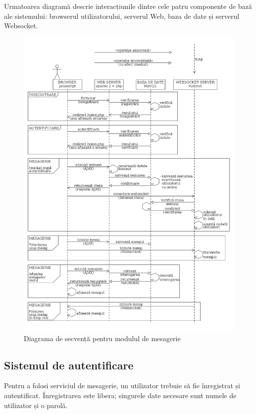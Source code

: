 \documentclass[12pt,a4paper]{article}
\begin{document}
Urmatoarea diagramă descrie interacțiunile dintre cele patru componente 
de bază ale sistemului: browserul utilizatorului, serverul Web, baza de date și 
serverul Websocket.

%
\newpage
	\begin{figure}[!ht]
	\centering
	\includegraphics[height=0.97\textheight]{diagrame/chat_sequence.png}
	\vspace{-20pt} 
	\caption{Diagrama de secvență pentru modulul de mesagerie \label{overflow}}
	\vspace{-20pt} 
\end{figure}

\subsection{Sistemul de autentificare}
Pentru a folosi serviciul de mesagerie, un utilizator trebuie să fie înregistrat și autentificat. Înregistrarea este libera; singurele date necesare sunt numele de utilizator
și o parolă.
\end{document}
